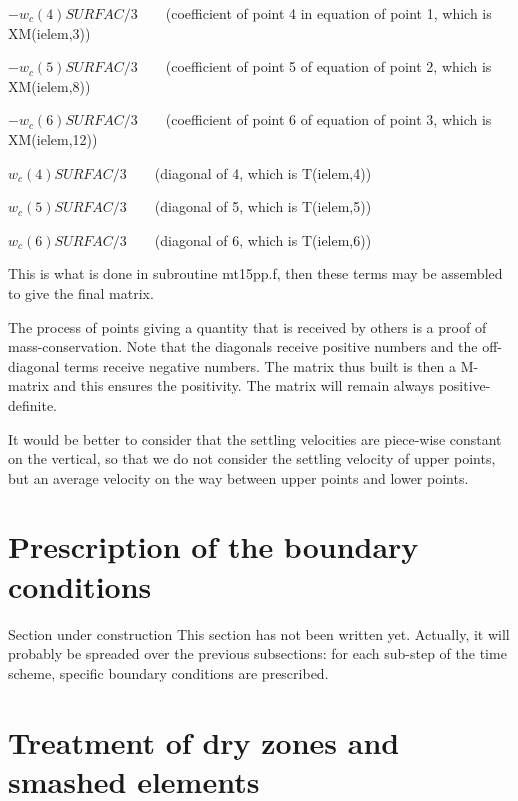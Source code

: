 $-w_{c}(4)SURFAC/3\qquad$(coefficient of point 4 in equation of point 1, which
is XM(ielem,3))

$-w_{c}(5)SURFAC/3\qquad$(coefficient of point 5 of equation of point 2, which
is XM(ielem,8))

$-w_{c}(6)SURFAC/3\qquad$(coefficient of point 6 of equation of point 3, which
is XM(ielem,12))

$w_{c}(4)SURFAC/3\qquad$(diagonal of 4, which is T(ielem,4))

$w_{c}(5)SURFAC/3\qquad$(diagonal of 5, which is T(ielem,5))

$w_{c}(6)SURFAC/3\qquad$(diagonal of 6, which is T(ielem,6))

This is what is done in subroutine mt15pp.f, then these terms may be assembled
to give the final matrix.

The process of points giving a quantity that is received by others is a proof
of mass-conservation. Note that the diagonals receive positive numbers and the
off-diagonal terms receive negative numbers. The matrix thus built is then a
M-matrix and this ensures the positivity. The matrix will remain always positive-definite.

It would be better to consider that the settling velocities are piece-wise
constant on the vertical, so that we do not consider the settling velocity of
upper points, but an average velocity on the way between upper points and
lower points.


\section{Prescription of the boundary conditions}

\begin{WarningBlock}{Section under construction}
This section has not been written yet. Actually, it will probably be
spreaded over the previous subsections: for each sub-step of the time scheme,
specific boundary conditions are prescribed.
\end{WarningBlock}

\section{\label{bancs decouvrants 3D}Treatment of dry zones and smashed elements}

